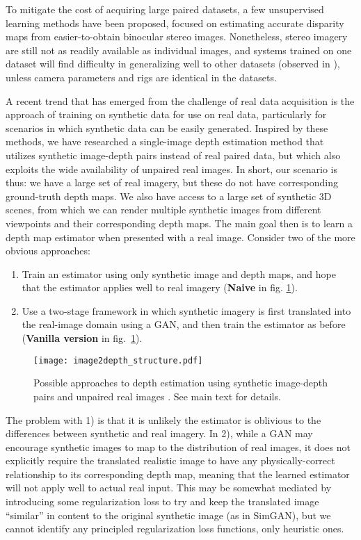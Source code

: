 \documentclass[runningheads]{llncs}
\begin{document}
To mitigate the cost of acquiring large paired datasets, a few unsupervised learning methods \cite{garg2016unsupervised,godard2017unsupervised,kuznietsov2017semi} have been proposed, focused on estimating accurate disparity maps from easier-to-obtain binocular stereo images. Nonetheless, stereo imagery are still not as readily available as individual images, and systems trained on one dataset will find difficulty in generalizing well to other datasets (observed in \cite{godard2017unsupervised}), unless camera parameters and rigs are identical in the datasets.

A recent trend that has emerged from the challenge of real data acquisition is the approach of training on synthetic data for use on real data\cite{qiu2016unrealcv,shrivastava2017learning,hoffman2017cycada}, particularly for scenarios in which synthetic data can be easily generated. Inspired by these methods, we have researched a single-image depth estimation method that utilizes synthetic image-depth pairs instead of real paired data, but which also exploits the wide availability of unpaired real images. In short, our scenario is thus: we have a large set of real imagery, but these do not have corresponding ground-truth depth maps. We also have access to a large set of synthetic 3D scenes, from which we can render multiple synthetic images from different viewpoints and their corresponding depth maps. The main goal then is to learn a depth map estimator when presented with a real image.
Consider two of the more obvious approaches:
\begin{enumerate}
	\item Train an estimator using only synthetic image and depth maps, and hope that the estimator applies well to real imagery ({\bf Naive} in fig. \ref{fig:structure}). 
	\item Use a two-stage framework in which synthetic imagery is first translated into the real-image domain using a GAN, and then train the estimator as before ({\bf Vanilla version} in fig.~\ref{fig:structure}).
\end{enumerate}
\begin{figure}[tb!]
	\centering
	\texttt{[image: image2depth\_structure.pdf]}
	
	\caption{Possible approaches to depth estimation using synthetic image-depth pairs  and unpaired real images . See main text for details.} 
	\label{fig:structure}
\end{figure}
The problem with 1) is that it is unlikely the estimator is oblivious to the differences between synthetic and real imagery. In 2), while a GAN may encourage synthetic images to map to the distribution of real images, it does not explicitly require the translated realistic image to have any physically-correct relationship to its corresponding depth map, meaning that the learned estimator will not apply well to actual real input. This may be somewhat mediated by introducing some regularization loss to try and keep the translated image ``similar'' in content to the original synthetic image (as in SimGAN\cite{shrivastava2017learning}), but we cannot identify any principled regularization loss functions, only heuristic ones.
\end{document}
